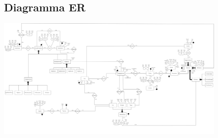 \begin{figure}
    \subsection{Diagramma ER}
    \centerline{\includegraphics[width=25cm,keepaspectratio,angle=90]{src/progettazioneConcettuale/assests/cantina_ER.png}}
\end{figure}